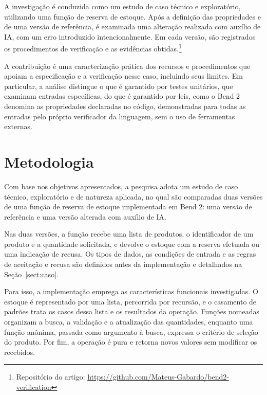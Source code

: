 A investigação é conduzida como um estudo de caso técnico e exploratório, utilizando uma função de reserva de estoque. Após a definição das propriedades e de uma versão de referência, é examinada uma alteração realizada com auxílio de IA, com um erro introduzido intencionalmente. Em cada versão, são registrados os procedimentos de verificação e as evidências obtidas.\footnote{Repositório do artigo: \url{https://github.com/Mateus-Gabardo/bend2-verification}}

A contribuição é uma caracterização prática dos recursos e procedimentos que apoiam a especificação e a verificação nesse caso, incluindo seus limites. Em particular, a análise distingue o que é garantido por testes unitários, que examinam entradas específicas, do que é garantido por leis, como o Bend 2 denomina as propriedades declaradas no código, demonstradas para todas as entradas pelo próprio verificador da linguagem, sem o uso de ferramentas externas.

\section{Metodologia}
\label{sect:metodologia}

Com base nos objetivos apresentados, a pesquisa adota um estudo de caso técnico, exploratório e de natureza aplicada, no qual são comparadas duas versões de uma função de reserva de estoque implementada em Bend 2: uma versão de referência e uma versão alterada com auxílio de IA.

Nas duas versões, a função recebe uma lista de produtos, o identificador de um produto e a quantidade solicitada, e devolve o estoque com a reserva efetuada ou uma indicação de recusa. Os tipos de dados, as condições de entrada e as regras de aceitação e recusa são definidos antes da implementação e detalhados na Seção~\ref{sect:caso}.

Para isso, a implementação emprega as características funcionais investigadas. O estoque é representado por uma lista, percorrida por recursão, e o casamento de padrões trata os casos dessa lista e os resultados da operação. Funções nomeadas organizam a busca, a validação e a atualização das quantidades, enquanto uma função anônima, passada como argumento à busca, expressa o critério de seleção do produto. Por fim, a operação é pura e retorna novos valores sem modificar os recebidos.

